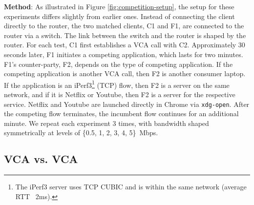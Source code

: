 \noindent \textbf{Method}: As illustrated in Figure \ref{fig:competition-setup}, the setup for these experiments differs slightly from earlier ones. 
Instead of connecting the client directly to the router, the two matched clients, C1 and F1, are connected to the router via a switch. 
The link between the switch and the router is shaped by the router. For each test, C1 first establishes a VCA call with C2.
Approximately 30 seconds later, F1 initiates a competing application, which lasts for two minutes.
F1's counter-party, F2, depends on the type of competing application.
If the competing application is another VCA call, then F2 is another consumer laptop.
If the application is an iPerf3\footnote{The iPerf3 server uses TCP CUBIC and is  within the same network (average RTT ~2ms).} (TCP) flow, then F2 is a server on the same network,
  and if it is Netflix or Youtube, then F2 is a server for the respective service. Netflix and Youtube are launched directly in Chrome via \texttt{xdg-open}.
After the competing flow terminates, the incumbent flow continues for an additional minute.
We repeat each experiment 3 times, with bandwidth shaped symmetrically at levels of \{0.5, 1, 2, 3, 4, 5\}~Mbps.

\subsection{VCA vs. VCA}


